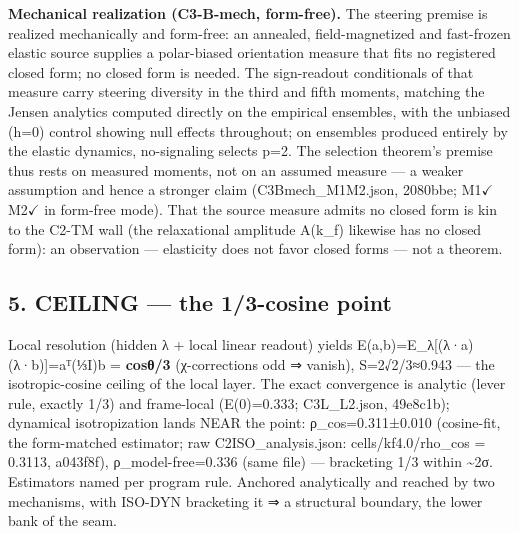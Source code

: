 \documentclass[
  11pt]{article}
\begin{document}
\textbf{Mechanical realization (C3-B-mech, form-free).} The steering
premise is realized mechanically and form-free: an annealed,
field-magnetized and fast-frozen elastic source supplies a polar-biased
orientation measure that fits no registered closed form; no closed form
is needed. The sign-readout conditionals of that measure carry steering
diversity in the third and fifth moments, matching the Jensen analytics
computed directly on the empirical ensembles, with the unbiased (h=0)
control showing null effects throughout; on ensembles produced entirely
by the elastic dynamics, no-signaling selects p=2. The selection
theorem's premise thus rests on measured moments, not on an assumed
measure --- a weaker assumption and hence a stronger claim
(C3Bmech\_M1M2.json, 2080bbe; M1\(\checkmark\)M2\(\checkmark\) in
form-free mode). That the source measure admits no closed form is kin to
the C2-TM wall (the relaxational amplitude A(k\_f) likewise has no
closed form): an observation --- elasticity does not favor closed forms
--- not a theorem.

\subsection{5. CEILING --- the 1/3-cosine
point}\label{ceiling-the-13-cosine-point}

Local resolution (hidden λ + local linear readout) yields
E(a,b)=E\_λ{[}(λ·a)(λ·b){]}=aᵀ(⅓I)b = \textbf{cosθ/3} (χ-corrections odd
⇒ vanish), S=2√2/3≈0.943 --- the isotropic-cosine ceiling of the local
layer. The exact convergence is analytic (lever rule, exactly 1/3) and
frame-local (E(0)=0.333; C3L\_L2.json, 49e8c1b); dynamical
isotropization lands NEAR the point: ρ\_cos=0.311±0.010 (cosine-fit, the
form-matched estimator; raw C2ISO\_analysis.json: cells/kf4.0/rho\_cos =
0.3113, a043f8f), ρ\_model-free=0.336 (same file) --- bracketing 1/3
within \textasciitilde2σ. Estimators named per program rule. Anchored
analytically and reached by two mechanisms, with ISO-DYN bracketing it ⇒
a structural boundary, the lower bank of the seam.
\end{document}
